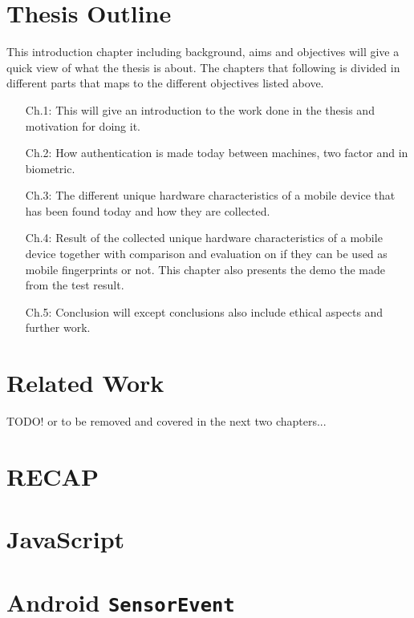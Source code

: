 \section{Thesis Outline}\label{sec:outline}
This introduction chapter including background, aims and objectives will give a quick view of what the thesis is about. The chapters that following is divided in different parts that maps to the different objectives listed above.
\begin{itemize}
	\item[Ch.1: ]	This will give an introduction to the work done in the thesis and motivation for doing it.
	\item[Ch.2: ]	How authentication is made today between machines, two factor and in biometric.
	\item[Ch.3: ]	The different unique hardware characteristics of a mobile device that has been found today and how they are collected.
	\item[Ch.4: ]	Result of the collected unique hardware characteristics of a mobile device together with comparison and evaluation on if they can be used as mobile fingerprints or not. This chapter also presents the demo the made from the test result.
	\item[Ch.5: ]	Conclusion will except conclusions also include ethical aspects and further work. 
\end{itemize}


\section{Related Work}\label{sec:relatedWork}
TODO! or to be removed and covered in the next two chapters...

\section{RECAP}
\section{JavaScript}
\section{Android \texttt{SensorEvent}}

